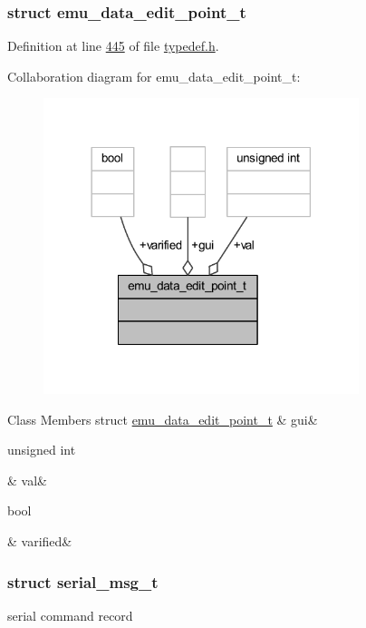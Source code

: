 \subsubsection{struct emu\+\_\+data\+\_\+edit\+\_\+point\+\_\+t}


Definition at line \hyperlink{a00001_source_l00445}{445} of file \hyperlink{a00001_source}{typedef.\+h}.



Collaboration diagram for emu\+\_\+data\+\_\+edit\+\_\+point\+\_\+t\+:
\nopagebreak
\begin{figure}[H]
\begin{center}
\leavevmode
\includegraphics[width=261pt]{d4/d9a/a00246}
\end{center}
\end{figure}
\begin{DoxyFields}{Class Members}
\hypertarget{a00001_ad927f72d9047284b972a0aaa5aa94b93}{struct \hyperlink{a00001_da/d24/a00068}{emu\+\_\+data\+\_\+edit\+\_\+point\+\_\+t}}\label{a00001_ad927f72d9047284b972a0aaa5aa94b93}
&
gui&
\\
\hline

\hypertarget{a00001_aaf35f240371007fbceb3387f76ad53a7}{unsigned int}\label{a00001_aaf35f240371007fbceb3387f76ad53a7}
&
val&
\\
\hline

\hypertarget{a00001_a323215e6b842728bdcc040da68b7fb45}{bool}\label{a00001_a323215e6b842728bdcc040da68b7fb45}
&
varified&
\\
\hline

\end{DoxyFields}
\label{df/dc8/a00122}
\hypertarget{a00001_df/dc8/a00122}{}
\subsubsection{struct serial\+\_\+msg\+\_\+t}
serial command record 

